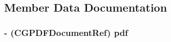 \subsection{Member Data Documentation}
\hypertarget{interface_a_p_p_child_view_controller_a49090a70e7ab1989a9675acbd042eb9e}{
\subsubsection[{pdf}]{\setlength{\rightskip}{0pt plus 5cm}-\/ (C\+G\+P\+D\+F\+Document\+Ref) pdf\hspace{0.3cm}{\ttfamily [protected]}}}\label{interface_a_p_p_child_view_controller_a49090a70e7ab1989a9675acbd042eb9e}


